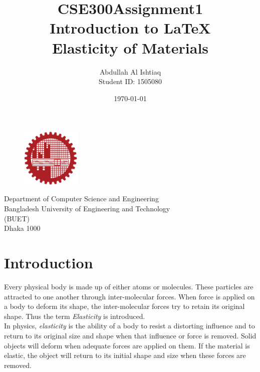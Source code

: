 \documentclass{article}
\title{\Large{CSE300\textunderscore Assignment1 \\ 
    Introduction to \LaTeX} \\ 
    \Huge{Elasticity of Materials} }
\author{Abdullah Al Ishtiaq \\
    Student ID: 1505080 }
\date{}
\begin{document}
\maketitle

\vspace{4cm}

\begin{figure}[h!]
\centering
    \includegraphics[width = 0.25\textwidth]{Figures/logoBUET.png}
\end{figure}
\begin{center}

\vspace{.5cm}

\Large{Department of Computer Science and Engineering \\
    Bangladesh University of Engineering and Technology \\
    (BUET) \\
    Dhaka 1000 \\
    \date{\today} }

\end{center}


\newpage

\tableofcontents
\newpage

\section{Introduction}

    Every physical body is made up of either atoms or molecules. These particles are attracted to one another through inter-molecular forces. When force is applied on a body to deform its shape, the inter-molecular forces try to retain its original shape. Thus the term \textit{Elasticity} is introduced.\\

    In physics, \textit{elasticity} is the ability of a body to resist a distorting influence and to return to its original size and shape when that influence or force is removed. Solid objects will deform when adequate forces are applied on them. If the material is elastic, the object will return to its initial shape and size when these forces are removed.
\end{document}
